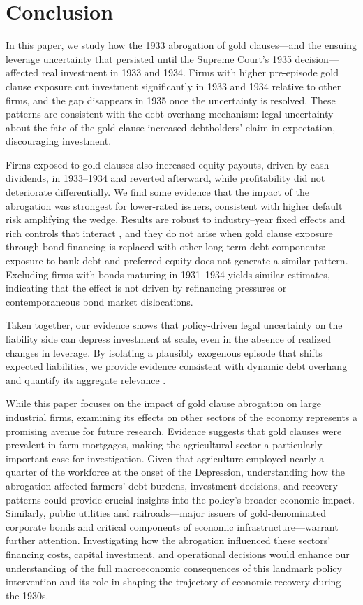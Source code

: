 \section{Conclusion}
\label{sec:conc}

\noindent In this paper, we study how the 1933 abrogation of gold clauses---and the ensuing leverage uncertainty that persisted until the Supreme Court's 1935 decision---affected real investment in 1933 and 1934. Firms with higher pre-episode gold clause exposure cut investment significantly in 1933 and 1934 relative to other firms, and the gap disappears in 1935 once the uncertainty is resolved. These patterns are consistent with the debt-overhang mechanism: legal uncertainty about the fate of the gold clause increased debtholders' claim in expectation, discouraging investment.

Firms exposed to gold clauses also increased equity payouts, driven by cash dividends, in 1933--1934 and reverted afterward, while profitability did not deteriorate differentially. We find some evidence that the impact of the abrogation was strongest for lower-rated issuers, consistent with higher default risk amplifying the wedge. Results are robust to industry--year fixed effects and rich controls that interact , and they do not arise when gold clause exposure through bond financing is replaced with other long-term debt components: exposure to bank debt and preferred equity does not generate a similar pattern. Excluding firms with bonds maturing in 1931--1934 yields similar estimates, indicating that the effect is not driven by refinancing pressures or contemporaneous bond market dislocations.

Taken together, our evidence shows that policy-driven legal uncertainty on the liability side can depress investment at scale, even in the absence of realized changes in leverage. By isolating a plausibly exogenous episode that shifts expected liabilities, we provide evidence consistent with dynamic debt overhang and quantify its aggregate relevance .

While this paper focuses on the impact of gold clause abrogation on large industrial firms, examining its effects on other sectors of the economy represents a promising avenue for future research. Evidence suggests that gold clauses were prevalent in farm mortgages, making the agricultural sector a particularly important case for investigation. Given that agriculture employed nearly a quarter of the workforce at the onset of the Depression, understanding how the abrogation affected farmers' debt burdens, investment decisions, and recovery patterns could provide crucial insights into the policy's broader economic impact. Similarly, public utilities and railroads---major issuers of gold-denominated corporate bonds and critical components of economic infrastructure---warrant further attention. Investigating how the abrogation influenced these sectors' financing costs, capital investment, and operational decisions would enhance our understanding of the full macroeconomic consequences of this landmark policy intervention and its role in shaping the trajectory of economic recovery during the 1930s.
